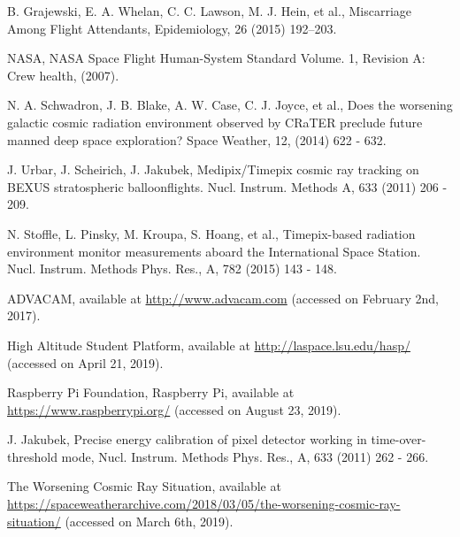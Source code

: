 \begin{thebibliography}{00}
  B. Grajewski, E. A. Whelan, C. C. Lawson, M. J. Hein, et al., Miscarriage Among Flight Attendants, Epidemiology, 26 (2015) 192–203.

  NASA, NASA Space Flight Human-System Standard Volume. 1, Revision A: Crew health, (2007).
  
  N. A. Schwadron, J. B. Blake, A. W. Case, C. J. Joyce, et al., Does the worsening galactic cosmic radiation environment observed by CRaTER preclude future manned deep space exploration? Space Weather, 12, (2014) 622 - 632.

  J. Urbar, J. Scheirich, J. Jakubek, Medipix/Timepix cosmic ray tracking on BEXUS stratospheric balloonflights. Nucl. Instrum. Methods A, 633 (2011) 206 - 209.

 N. Stoffle, L. Pinsky, M. Kroupa, S. Hoang, et al., Timepix-based radiation environment monitor measurements aboard the International Space Station. Nucl. Instrum. Methods Phys. Res., A, 782 (2015) 143 - 148.

  ADVACAM, available at \url{http://www.advacam.com} (accessed on February 2nd, 2017).
  
  High Altitude Student Platform, available at \url{http://laspace.lsu.edu/hasp/} (accessed on April 21, 2019).
  
  Raspberry Pi Foundation, Raspberry Pi, available at \url{https://www.raspberrypi.org/} (accessed on August 23, 2019).

  J. Jakubek, Precise energy calibration of pixel detector working in time-over-threshold mode, Nucl. Instrum. Methods Phys. Res., A, 633 (2011) 262 - 266.

The Worsening Cosmic Ray Situation, available at \url{https://spaceweatherarchive.com/2018/03/05/the-worsening-cosmic-ray-situation/} (accessed on March 6th, 2019).  


\end{thebibliography}
